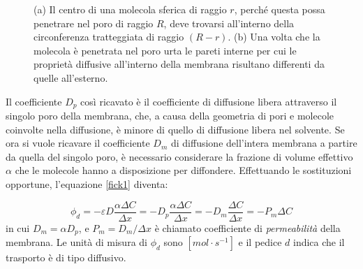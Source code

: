 \begin{figure}[htb]
	\centering
	\qquad
		\caption{(a) Il centro di una molecola sferica di raggio $r$, perché questa possa penetrare nel poro di raggio $R$, deve trovarsi all'interno della circonferenza tratteggiata di raggio $(R-r)$. (b) Una volta che la molecola è penetrata nel poro urta le pareti interne per cui le proprietà diffusive all'interno della membrana risultano differenti da quelle all'esterno.}\label{hindrance}
\end{figure}
Il coefficiente $D_p$ così ricavato è il coefficiente di diffusione libera attraverso il singolo poro della membrana, che, a causa della geometria di pori e molecole coinvolte nella diffusione, è minore di quello di diffusione libera nel solvente. Se ora si vuole ricavare il coefficiente $D_m$ di diffusione dell'intera membrana a partire da quella del singolo poro, è necessario considerare la frazione di volume effettivo $\alpha$ che le molecole hanno a disposizione per diffondere. Effettuando le sostituzioni opportune, l'equazione \ref{fick1} diventa:

\begin{equation}\label{phiD}
	\phi_d = - \varepsilon D \frac{\alpha\Delta C}{\Delta x} = - D_p \frac{\alpha\Delta C}{\Delta x} =  -D_m \frac{\Delta C}{\Delta x} = -P_m \Delta C
\end{equation}
\noindent
\newline
in cui $D_m = \alpha D_p$, e $P_m = D_m/\Delta x$ è chiamato coefficiente di \textit{permeabilità} della membrana. Le unità di misura di $\phi_d$ sono $[mol \cdot s^{-1}]$ e il pedice $d$ indica che il trasporto è di tipo diffusivo.